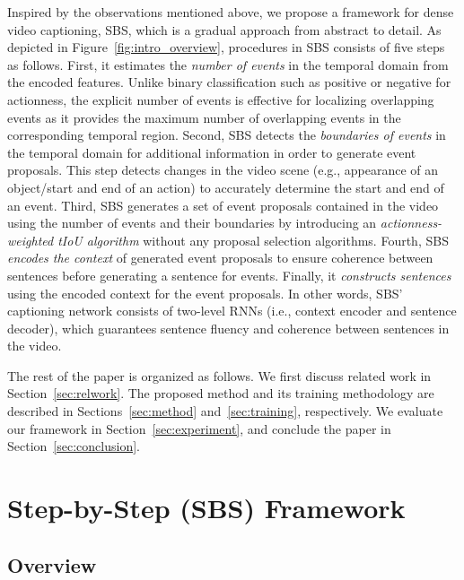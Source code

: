 Inspired by the observations mentioned above, we propose a framework for dense video captioning, SBS, which is a gradual approach from abstract to detail.
As depicted in Figure~\ref{fig:intro_overview}, procedures in SBS consists of five steps as follows.
First, it estimates the \textit{number of events} in the temporal domain from the encoded features.
Unlike binary classification such as positive or negative for actionness, the explicit number of events is effective for localizing overlapping events as it provides the maximum number of overlapping events in the corresponding temporal region.
Second, SBS detects the \textit{boundaries of events} in the temporal domain for additional information in order to generate event proposals.
This step detects changes in the video scene (e.g., appearance of an object/start and end of an action) to accurately determine the start and end of an event.
Third, SBS generates a set of event proposals contained in the video using the number of events and their boundaries by introducing an \textit{actionness-weighted tIoU algorithm} without any proposal selection algorithms.
Fourth, SBS \textit{encodes the context} of generated event proposals to ensure coherence between sentences before generating a sentence for events.
Finally, it \textit{constructs sentences} using the encoded context for the event proposals.
In other words, SBS' captioning network consists of two-level RNNs (i.e., context encoder and sentence decoder), which guarantees sentence fluency and coherence between sentences in the video.

The rest of the paper is organized as follows.
We first discuss related work in Section~\ref{sec:relwork}.
The proposed method and its training methodology are described in Sections~\ref{sec:method} and~\ref{sec:training}, respectively.
We evaluate our framework in Section~\ref{sec:experiment}, and conclude the paper in Section~\ref{sec:conclusion}.



\section{Step-by-Step (SBS) Framework}

\subsection{Overview}
\label{subsec:method_overview}

